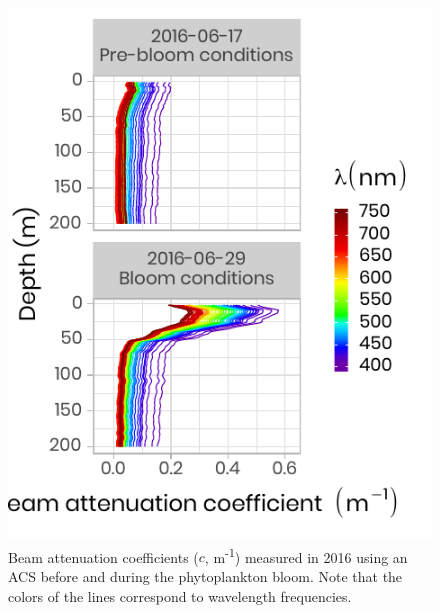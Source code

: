 \documentclass[12pt,a4paper]{scrartcl}
\begin{document}
\clearpage
\newpage

\begin{figure}[h]
	\centering
	\includegraphics[scale = 2]{../../../graphs/fig5.pdf}
	\caption{Beam attenuation coefficients ($c$, m\textsuperscript{-1}) measured in 2016 using an ACS before and during the phytoplankton bloom. Note that the colors of the lines correspond to wavelength frequencies.}
\end{figure}

\clearpage
\newpage
\end{document}
